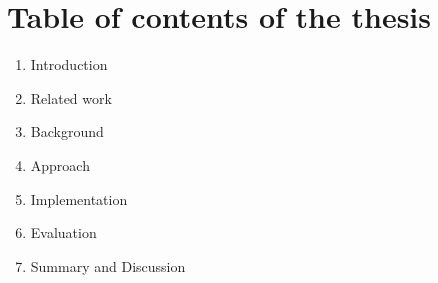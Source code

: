 \chapter{Table of contents of the thesis}
\label{ch:tableofcontents}



\begin{enumerate}
    \item Introduction
    \item Related work
    \item Background
    \item Approach
    \item Implementation
    \item Evaluation
    \item Summary and Discussion
\end{enumerate}